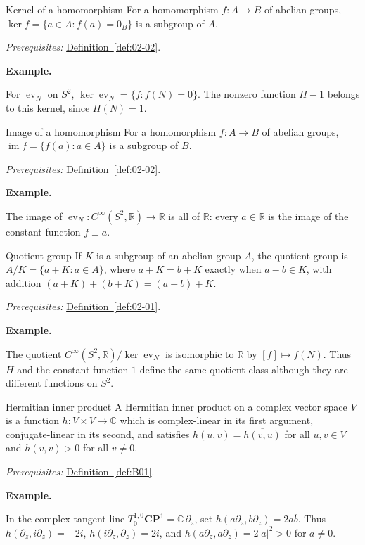 \documentclass[11pt]{article}
\makeatletter
\newcommand{\R}{\mathbb R}
\newcommand{\C}{\mathbb C}
\newcounter{definition}
\newcommand{\CP}{\mathbf{CP}}
\newcommand{\exampleheading}{\par\medskip\textbf{Example.}\par\smallskip}
\newcommand{\currentdefinition}[1]{\protected@edef\@currentlabel{#1}}
\makeatother
\begin{document}
\begin{definitionbox}{Kernel of a homomorphism}
\currentdefinition{\thedefinition}
\label{def:02-03}
For a homomorphism $f:A\to B$ of abelian groups, $\ker f=\{a\in A:f(a)=0_B\}$ is a subgroup of $A$.

\smallskip
\textit{Prerequisites:} \hyperref[def:02-02]{Definition~\ref*{def:02-02}}.

\exampleheading
For $\operatorname{ev}_N$ on $S^2$, $\ker\operatorname{ev}_N=\{f:f(N)=0\}$. The nonzero function $H-1$ belongs to this kernel, since $H(N)=1$.
\end{definitionbox}

\begin{definitionbox}{Image of a homomorphism}
\currentdefinition{\thedefinition}
\label{def:02-04}
For a homomorphism $f:A\to B$ of abelian groups, $\operatorname{im}f=\{f(a):a\in A\}$ is a subgroup of $B$.

\smallskip
\textit{Prerequisites:} \hyperref[def:02-02]{Definition~\ref*{def:02-02}}.

\exampleheading
The image of $\operatorname{ev}_N:C^\infty(S^2,\R)\to\R$ is all of $\R$: every $a\in\R$ is the image of the constant function $f\equiv a$.
\end{definitionbox}

\begin{definitionbox}{Quotient group}
\currentdefinition{\thedefinition}
\label{def:02-05}
If $K$ is a subgroup of an abelian group $A$, the quotient group is $A/K=\{a+K:a\in A\}$, where $a+K=b+K$ exactly when $a-b\in K$, with addition $(a+K)+(b+K)=(a+b)+K$.

\smallskip
\textit{Prerequisites:} \hyperref[def:02-01]{Definition~\ref*{def:02-01}}.

\exampleheading
The quotient $C^\infty(S^2,\R)/\ker\operatorname{ev}_N$ is isomorphic to $\R$ by $[f]\mapsto f(N)$. Thus $H$ and the constant function $1$ define the same quotient class although they are different functions on $S^2$.
\end{definitionbox}

\begin{definitionbox}{Hermitian inner product}
\currentdefinition{\thedefinition}
\label{def:B03}
A Hermitian inner product on a complex vector space $V$ is a function $h:V\times V\to\C$ which is complex-linear in its first argument, conjugate-linear in its second, and satisfies $h(u,v)=\overline{h(v,u)}$ for all $u,v\in V$ and $h(v,v)>0$ for all $v\ne0$.

\smallskip
\textit{Prerequisites:} \hyperref[def:B01]{Definition~\ref*{def:B01}}.

\exampleheading
In the complex tangent line $T_0^{1,0}\CP^1=\C\,\partial_z$, set $h(a\partial_z,b\partial_z)=2a\overline b$. Thus $h(\partial_z,i\partial_z)=-2i$, $h(i\partial_z,\partial_z)=2i$, and $h(a\partial_z,a\partial_z)=2|a|^2>0$ for $a\ne0$.
\end{definitionbox}
\end{document}
